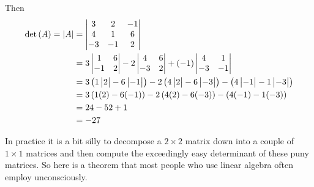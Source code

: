 \documentclass{ximera}
\begin{document}
\begin{example}
  Then
  \begin{align*}
    \det\left(A\right)=\left\lvert A\right\rvert
    &=\begin{vmatrix}
      3 & 2 & -1\\
      4 & 1 & 6\\
      -3 & -1 & 2
    \end{vmatrix}\\
    &=
      3
      \begin{vmatrix}
        1 & 6\\
        -1 & 2
      \end{vmatrix}
             -2
             \begin{vmatrix}
               4 & 6\\
               -3 & 2
             \end{vmatrix}
                    +(-1)
                    \begin{vmatrix}
                      4 & 1\\
                      -3 & -1
                    \end{vmatrix}\\
    &=
      3\left(
      1\begin{vmatrix}
        2\\
      \end{vmatrix}
    -6\begin{vmatrix}
      -1
    \end{vmatrix}\right)
    -2\left(
    4\begin{vmatrix}
      2
    \end{vmatrix}
    -6\begin{vmatrix}
      -3
    \end{vmatrix}\right)
    -\left(
    4\begin{vmatrix}
      -1
    \end{vmatrix}
    -1\begin{vmatrix}
      -3
    \end{vmatrix}\right)\\
    &=
      3\left(1(2)-6(-1)\right)
      -2\left(4(2)-6(-3)\right)
      -\left(4(-1)-1(-3)\right)\\
    &=24-52+1\\
    &=-27
  \end{align*}
\end{example}

In practice it is a bit silly to decompose a $2\times 2$ matrix down
into a couple of $1\times 1$ matrices and then compute the exceedingly
easy determinant of these puny matrices.  So here is a theorem that
most people who use linear algebra often employ unconsciously.
\end{document}
